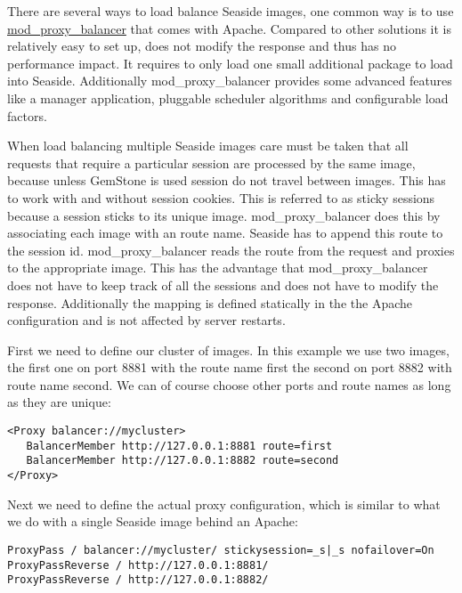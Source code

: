 \documentclass[a4paper,10pt,twoside]{book}
\newcommand{\ct}[1]{{\small\ttfamily\textup{#1}}}
\begin{document}
There are several ways to load balance Seaside images, one common way is to use \href{http://httpd.apache.org/docs/2.2/mod/mod_proxy_balancer.html}{\ct{mod\_proxy\_balancer}} that comes with Apache. Compared to other solutions it is relatively easy to set up, does not modify the response and thus has no performance impact. It requires to only load one small additional package to load into Seaside. Additionally \ct{mod\_proxy\_balancer} provides some advanced features like a manager application, pluggable scheduler algorithms and configurable load factors.

When load balancing multiple Seaside images care must be taken that all requests that require a particular session are processed by the same image, because unless GemStone is used session do not travel between images. This has to work with and without session cookies. This is referred to as sticky sessions because a session sticks to its unique image. \ct{mod\_proxy\_balancer} does this by associating each image with an route name. Seaside has to append this route to the session id. \ct{mod\_proxy\_balancer} reads the route from the request and proxies to the appropriate image. This has the advantage that \ct{mod\_proxy\_balancer} does not have to keep track of all the sessions and does not have to modify the response. Additionally the mapping is defined statically in the the Apache configuration and is not affected by server restarts.

First we need to define our cluster of images. In this example we use two images, the first one on port 8881 with the route name first the second on port 8882 with route name second. We can of course choose other ports and route names as long as they are unique:

\begin{lstlisting}
<Proxy balancer://mycluster>
   BalancerMember http://127.0.0.1:8881 route=first
   BalancerMember http://127.0.0.1:8882 route=second
</Proxy>
\end{lstlisting}

Next we need to define the actual proxy configuration, which is similar to what we do with a single Seaside image behind an Apache:

\begin{lstlisting}
ProxyPass / balancer://mycluster/ stickysession=_s|_s nofailover=On
ProxyPassReverse / http://127.0.0.1:8881/
ProxyPassReverse / http://127.0.0.1:8882/
\end{lstlisting}
\end{document}
